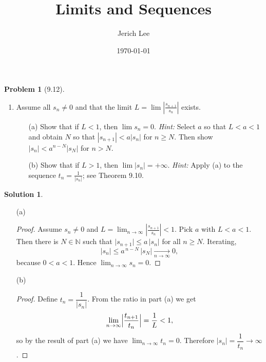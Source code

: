 \documentclass[12pt]{article}
\title{Limits and Sequences}
\author{Jerich Lee}
\date{\today}
\theoremstyle{definition} %
\newtheorem{solution}{Solution}
\newtheorem*{proposition}{Proposition}
\newtheorem{problem}{Problem}
\theoremstyle{plain} %
\begin{document}
\maketitle

\begin{problem}[9.12]
    \begin{enumerate}
        \item Assume all $s_n \neq 0$ and that the limit $L = \lim \left| \frac{s_{n+1}}{s_n} \right|$ exists.
        \begin{enumerate}
            \item[(a)] Show that if $L < 1$, then $\lim s_n = 0$. \emph{Hint:} Select $a$ so that $L < a < 1$ and obtain $N$ so that $|s_{n+1}| < a|s_n|$ for $n \ge N$. Then show $|s_n| < a^{n-N}|s_N|$ for $n > N$.
            \item[(b)] Show that if $L > 1$, then $\lim |s_n| = +\infty$. \emph{Hint:} Apply (a) to the sequence $t_n = \frac{1}{|s_n|}$; see Theorem 9.10.
        \end{enumerate}
    \end{enumerate}
\end{problem}

\begin{solution}
    \begin{enumerate}
      \item[(a)]
        \begin{proof}
          Assume $s_n\neq0$ and  
          $\displaystyle L=\lim_{n\to\infty}\left|\frac{s_{n+1}}{s_n}\right|<1$.
          Pick $a$ with $L<a<1$.  
          Then there is $N\in\mathbb N$ such that
          $\bigl|s_{n+1}\bigr|\le a\,\bigl|s_n\bigr|$ for all $n\ge N$.
          Iterating,
          \[
             |s_{n}| \le a^{\,n-N}\,|s_N| \xrightarrow[n\to\infty]{} 0,
          \]
          because $0<a<1$. Hence $\displaystyle\lim_{n\to\infty}s_n=0$.
        \end{proof}
  
      \item[(b)]
        \begin{proof}
          Define $t_n = \dfrac{1}{|s_n|}$.  
          From the ratio in part (a) we get
          \[
            \lim_{n\to\infty}\Bigl|\frac{t_{n+1}}{t_n}\Bigr|
            =\frac{1}{L}<1,
          \]
          so by the result of part (a) we have $\displaystyle\lim_{n\to\infty}t_n=0$.
          Therefore $|s_n|=\dfrac1{t_n}\to\infty$.
        \end{proof}
    \end{enumerate}
  \end{solution}
\end{document}
